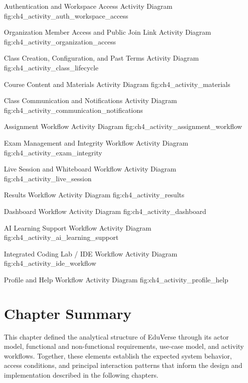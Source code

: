 \clearpage

\EduActivityFigureReadable{\EduActivityAuthWorkspaceAccessDiagram}
  {Authentication and Workspace Access Activity Diagram}
  {fig:ch4_activity_auth_workspace_access}

\EduActivityFigureReadable{\EduActivityOrganizationAccessDiagram}
  {Organization Member Access and Public Join Link Activity Diagram}
  {fig:ch4_activity_organization_access}

\EduActivityFigure{\EduActivityClassLifecycleDiagram}
  {Class Creation, Configuration, and Past Terms Activity Diagram}
  {fig:ch4_activity_class_lifecycle}

\EduActivityFigureReadable{\EduActivityMaterialsWorkflowDiagram}
  {Course Content and Materials Activity Diagram}
  {fig:ch4_activity_materials}

\EduActivityFigureTall{\EduActivityCommunicationNotificationsDiagram}
  {Class Communication and Notifications Activity Diagram}
  {fig:ch4_activity_communication_notifications}

\EduActivityFigureReadable{\EduActivityAssignmentWorkflowDiagram}
  {Assignment Workflow Activity Diagram}
  {fig:ch4_activity_assignment_workflow}

\EduActivityFigureTall{\EduActivityExamIntegrityWorkflowDiagram}
  {Exam Management and Integrity Workflow Activity Diagram}
  {fig:ch4_activity_exam_integrity}

\EduActivityFigure{\EduActivityLiveSessionWorkflowDiagram}
  {Live Session and Whiteboard Workflow Activity Diagram}
  {fig:ch4_activity_live_session}

\EduActivityFigureTall{\EduActivityResultsWorkflowDiagram}
  {Results Workflow Activity Diagram}
  {fig:ch4_activity_results}

\EduActivityFigureReadable{\EduActivityDashboardWorkflowDiagram}
  {Dashboard Workflow Activity Diagram}
  {fig:ch4_activity_dashboard}

\EduActivityFigureReadable{\EduActivityAiLearningSupportWorkflowDiagram}
  {AI Learning Support Workflow Activity Diagram}
  {fig:ch4_activity_ai_learning_support}

\EduActivityFigure{\EduActivityIdeWorkflowDiagram}
  {Integrated Coding Lab / IDE Workflow Activity Diagram}
  {fig:ch4_activity_ide_workflow}

\EduActivityFigureReadable{\EduActivityProfileHelpWorkflowDiagram}
  {Profile and Help Workflow Activity Diagram}
  {fig:ch4_activity_profile_help}

\endgroup

\clearpage

\section{Chapter Summary}\label{sec:chapter4_summary}

This chapter defined the analytical structure of EduVerse through its actor
model, functional and non-functional requirements, use-case model, and activity
workflows. Together, these elements establish the expected system behavior,
access conditions, and principal interaction patterns that inform the design
and implementation described in the following chapters.

